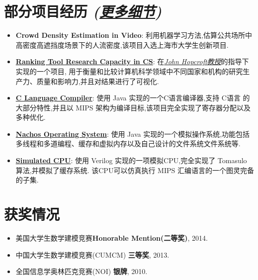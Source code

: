 \documentclass[letterpaper]{article}
\begin{document}
\section*{部分项目经历 \normalsize{\it(\href{https://github.com/lostleaf?tab=repositories}{更多细节})}}
\begin{itemize}
\item \textbf{Crowd Density Estimation in Video}:
利用机器学习方法,估算公共场所中高密度高遮挡度场景下的人流密度,该项目入选上海市大学生创新项目.
\item \textbf{\href{http://acm.sjtu.edu.cn/ricsrt/}{Ranking Tool Research Capacity in CS}}:
在\textit{\href{http://www.cs.cornell.edu/jeh/}{John Hopcroft教授}}的指导下实现的一个项目, 用于衡量和比较计算机科学领域中不同国家和机构的研究生产力、质量和影响力,并且对结果进行了可视化.
\item \textbf{\href{https://github.com/lostleaf/compiler}{C Language Compiler}}:
使用 Java 实现的一个C语言编译器,支持 C语言 的大部分特性,并且以 MIPS 架构为编译目标,该项目完全实现了寄存器分配以及多种优化.
\item \textbf{\href{https://github.com/lostleaf/nachos}{Nachos Operating System}}: 
使用 Java 实现的一个模拟操作系统,功能包括多线程和多道编程、缓存和虚拟内存以及自己设计的文件系统文件系统等.
\item \textbf{\href{https://github.com/lostleaf/cpu}{Simulated CPU}}:
使用 Verilog 实现的一项模拟CPU,完全实现了 Tomasulo 算法,并模拟了缓存系统. 该CPU可以仿真执行 MIPS 汇编语言的一个图灵完备的子集.

\end{itemize}

\section*{获奖情况}
\begin{itemize}
\item  美国大学生数学建模竞赛\textbf{Honorable Mention(二等奖)}, 2014.
\item 中国大学生数学建模竞赛(CUMCM) \textbf{三等奖}, 2013. 
\item 全国信息学奥林匹克竞赛(NOI) \textbf{银牌}, 2010. 
\end{itemize}
\end{document}
